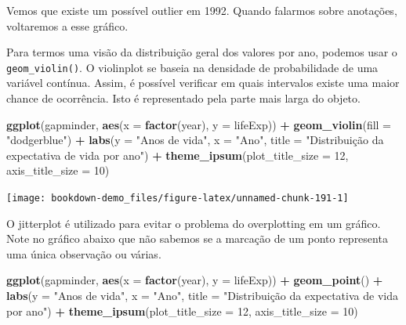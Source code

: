\documentclass[]{book}
\newenvironment{Shaded}{\begin{snugshade}}{\end{snugshade}}
\newcommand{\KeywordTok}[1]{\textcolor[rgb]{0.13,0.29,0.53}{\textbf{#1}}}
\newcommand{\DataTypeTok}[1]{\textcolor[rgb]{0.13,0.29,0.53}{#1}}
\newcommand{\DecValTok}[1]{\textcolor[rgb]{0.00,0.00,0.81}{#1}}
\newcommand{\StringTok}[1]{\textcolor[rgb]{0.31,0.60,0.02}{#1}}
\newcommand{\OperatorTok}[1]{\textcolor[rgb]{0.81,0.36,0.00}{\textbf{#1}}}
\newcommand{\NormalTok}[1]{#1}
\begin{document}
Vemos que existe um possível outlier em 1992. Quando falarmos sobre
anotações, voltaremos a esse gráfico.

Para termos uma visão da distribuição geral dos valores por ano, podemos
usar o \texttt{geom\_violin()}. O violinplot se baseia na densidade de
probabilidade de uma variável contínua. Assim, é possível verificar em
quais intervalos existe uma maior chance de ocorrência. Isto é
representado pela parte mais larga do objeto.

\begin{Shaded}
\begin{Highlighting}[]
\KeywordTok{ggplot}\NormalTok{(gapminder, }\KeywordTok{aes}\NormalTok{(}\DataTypeTok{x =} \KeywordTok{factor}\NormalTok{(year), }\DataTypeTok{y =}\NormalTok{ lifeExp)) }\OperatorTok{+}
\StringTok{  }\KeywordTok{geom_violin}\NormalTok{(}\DataTypeTok{fill =} \StringTok{"dodgerblue"}\NormalTok{) }\OperatorTok{+}
\StringTok{  }\KeywordTok{labs}\NormalTok{(}\DataTypeTok{y =} \StringTok{"Anos de vida"}\NormalTok{,}
       \DataTypeTok{x =} \StringTok{"Ano"}\NormalTok{,}
       \DataTypeTok{title =} \StringTok{"Distribuição da expectativa de vida por ano"}\NormalTok{) }\OperatorTok{+}
\StringTok{  }\KeywordTok{theme_ipsum}\NormalTok{(}\DataTypeTok{plot_title_size =} \DecValTok{12}\NormalTok{,  }
              \DataTypeTok{axis_title_size =} \DecValTok{10}\NormalTok{) }
\end{Highlighting}
\end{Shaded}

\begin{center}\texttt{[image: bookdown-demo\_files/figure-latex/unnamed-chunk-191-1]} \end{center}

O jitterplot é utilizado para evitar o problema do overplotting em um
gráfico. Note no gráfico abaixo que não sabemos se a marcação de um
ponto representa uma única observação ou várias.

\begin{Shaded}
\begin{Highlighting}[]
\KeywordTok{ggplot}\NormalTok{(gapminder, }\KeywordTok{aes}\NormalTok{(}\DataTypeTok{x =} \KeywordTok{factor}\NormalTok{(year), }\DataTypeTok{y =}\NormalTok{ lifeExp)) }\OperatorTok{+}
\StringTok{  }\KeywordTok{geom_point}\NormalTok{() }\OperatorTok{+}
\StringTok{  }\KeywordTok{labs}\NormalTok{(}\DataTypeTok{y =} \StringTok{"Anos de vida"}\NormalTok{,}
       \DataTypeTok{x =} \StringTok{"Ano"}\NormalTok{,}
       \DataTypeTok{title =} \StringTok{"Distribuição da expectativa de vida por ano"}\NormalTok{) }\OperatorTok{+}
\StringTok{  }\KeywordTok{theme_ipsum}\NormalTok{(}\DataTypeTok{plot_title_size =} \DecValTok{12}\NormalTok{, }
              \DataTypeTok{axis_title_size =} \DecValTok{10}\NormalTok{) }
\end{Highlighting}
\end{Shaded}
\end{document}
